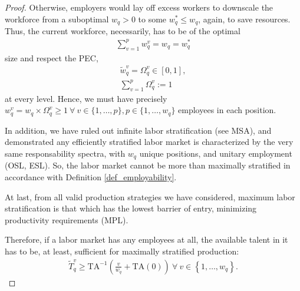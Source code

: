 \documentclass[hidelinks, nonatbib]{elsarticle}
\begin{document}
\begin{lemma}
\begin{proof}
        Otherwise, employers would lay off excess workers to downscale the workforce from a suboptimal $w_q > 0$ to some $w_{q}^{*} \leq w_q$, again, to save resources. Thus, the current workforce, necessarily, has to be of the optimal
        \begin{gather}
        \sum_{v=1}^{p}
        w_{q}^{v}
        =
        w_q
        =
        w_{q}^{*}
        \end{gather}
        size and respect the PEC,
        \begin{gather}
        \tilde{w}_{q}^{v}
        =
        \Omega_{q}^{v}
        \in
        [0,1]
        ,
        \\
        \sum_{v=1}^{p}
        \Omega_{q}^{v}
        :=
        1
        \end{gather}
        at every level. Hence, we must have precisely $w_{q}^{v} = w_q \times \Omega_{q}^{v} \geq 1 \ \forall \ v \in \{1,\dots, p\}, p \in \{1,\dots, w_q\}$ employees in each position.
        
        In addition, we have ruled out infinite labor stratification (see MSA), and demonstrated any efficiently stratified labor market is characterized by the very same responsability spectra, with $w_q$ unique positions, and unitary employment (OSL, ESL). So, the labor market cannot be more than maximally stratified in accordance with Definition \ref{def_employability}. 
        
        At last, from all valid production strategies we have considered, maximum labor stratification is that which has the lowest barrier of entry, minimizing productivity requirements (MPL).
        
        Therefore, if a labor market has any employees at all, the available talent in it has to be, at least, sufficient for maximally stratified production:
        \begin{gather}
            \tilde{T}_{q}^{v}
            \geq
            \text{TA}^{-1}\left(
                \frac{v}{w_q}
                +
                \text{TA}(0)
            \right)
            \
            \forall
            \
            v \in 
            \left\{
                1, \dots, w_q
            \right\}
            .
        \end{gather}
    \end{proof}
\end{lemma}
\end{document}
